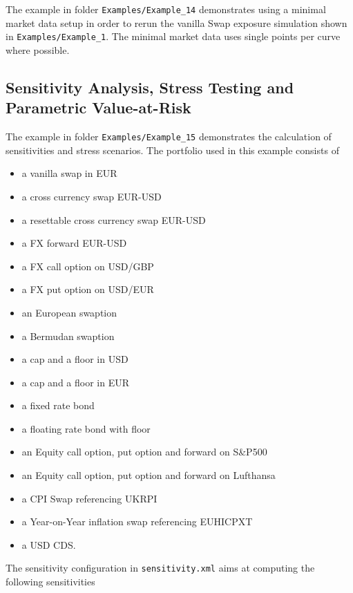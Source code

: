 \documentclass[12pt, a4paper]{article}
\begin{document}
The example in folder {\tt Examples/Example\_14} demonstrates using a minimal market data setup in order to rerun the vanilla Swap exposure simulation shown in {\tt Examples/Example\_1}. The minimal market data uses single points per curve where possible.

\subsection{Sensitivity Analysis, Stress Testing and Parametric Value-at-Risk}\label{ex:sensitivity_stress}

The example in folder {\tt Examples/Example\_15} demonstrates the calculation of sensitivities and stress scenarios. The
portfolio used in this example consists of

\begin{itemize}
\item a vanilla swap in EUR
\item a cross currency swap EUR-USD
\item a resettable cross currency swap EUR-USD
\item a FX forward EUR-USD
\item a FX call option on USD/GBP %
\item a FX put option on USD/EUR
\item an European swaption
\item a Bermudan swaption 
\item a cap and a floor in USD
\item a cap and a floor in EUR
\item a fixed rate bond
\item a floating rate bond with floor
\item an Equity call option, put option and forward on S\&P500
\item an Equity call option, put option and forward on Lufthansa
\item a CPI Swap referencing UKRPI
\item a Year-on-Year inflation swap referencing EUHICPXT
\item a USD CDS.
\end{itemize}

The sensitivity configuration in {\tt sensitivity.xml} aims at computing the following sensitivities
\end{document}

